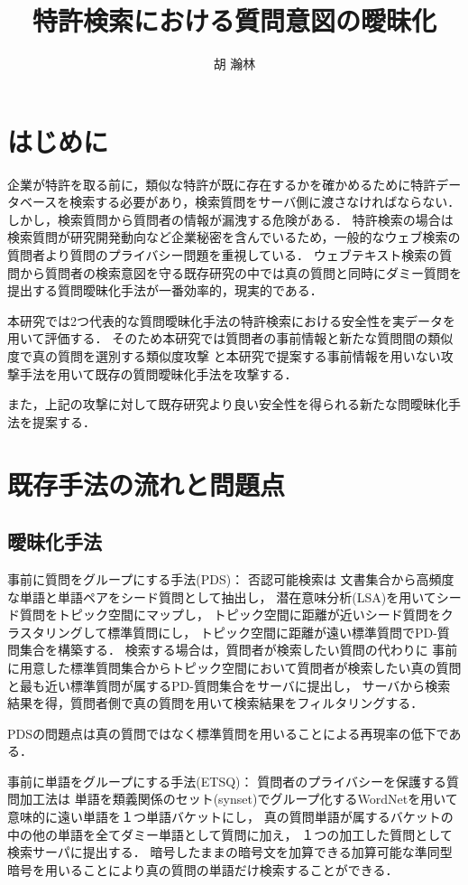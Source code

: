 \documentclass[papersize]{suribtabst}
\title{特許検索における質問意図の曖昧化}
\author{胡 瀚林}
\begin{document}
\maketitle

\section{はじめに} %
企業が特許を取る前に，類似な特許が既に存在するかを確かめるために特許データベースを検索する必要があり，検索質問をサーバ側に渡さなければならない．
しかし，検索質問から質問者の情報が漏洩する危険がある．
特許検索の場合は検索質問が研究開発動向など企業秘密を含んでいるため，一般的なウェブ検索の質問者より質問のプライバシー問題を重視している．
ウェブテキスト検索の質問から質問者の検索意図を守る既存研究の中では真の質問と同時にダミー質問を提出する質問曖昧化手法が一番効率的，現実的である．

本研究では2つ代表的な質問曖昧化手法\cite{embellishing2010,masking2014}の特許検索における安全性を実データを用いて評価する．
そのため本研究では質問者の事前情報と新たな質問間の類似度で真の質問を選別する類似度攻撃\cite{simattack2016}
と本研究で提案する事前情報を用いない攻撃手法を用いて既存の質問曖昧化手法を攻撃する．

また，上記の攻撃に対して既存研究より良い安全性を得られる新たな問曖昧化手法を提案する．

\section{既存手法の流れと問題点}
\subsection{曖昧化手法}
事前に質問をグループにする手法(PDS)\cite{providing2009}：
否認可能検索は
文書集合から高頻度な単語と単語ペアをシード質問として抽出し，
潜在意味分析(LSA)\cite{LSA1990}を用いてシード質問をトピック空間にマップし，
トピック空間に距離が近いシード質問をクラスタリングして標準質問にし，
トピック空間に距離が遠い標準質問でPD-質問集合を構築する．
検索する場合は，質問者が検索したい質問の代わりに
事前に用意した標準質問集合からトピック空間において質問者が検索したい真の質問と最も近い標準質問が属するPD-質問集合をサーバに提出し，
サーバから検索結果を得，質問者側で真の質問を用いて検索結果をフィルタリングする．

PDSの問題点は真の質問ではなく標準質問を用いることによる再現率の低下である．

事前に単語をグループにする手法(ETSQ)\cite{embellishing2010}：
質問者のプライバシーを保護する質問加工法は
単語を類義関係のセット(synset)でグループ化するWordNet\cite{wordnet1995}を用いて意味的に遠い単語を１つ単語バケットにし，
真の質問単語が属するバケットの中の他の単語を全てダミー単語として質問に加え，
１つの加工した質問として検索サーパに提出する．
暗号したままの暗号文を加算できる加算可能な準同型暗号\cite{dpe1994}を用いることにより真の質問の単語だけ検索することができる．
\end{document}
